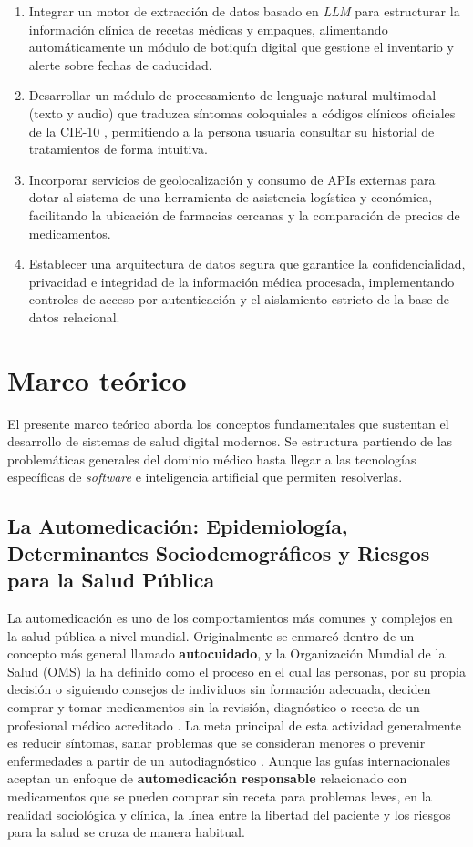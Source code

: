 \begin{enumerate}
    \item Integrar un motor de extracción de datos basado en \emph{LLM} para estructurar la información clínica de recetas médicas y empaques, alimentando automáticamente un módulo de botiquín digital que gestione el inventario y alerte sobre fechas de caducidad.
    \item Desarrollar un módulo de procesamiento de lenguaje natural multimodal (texto y audio) que traduzca síntomas coloquiales a códigos clínicos oficiales de la CIE-10 \cite{CIE10}, permitiendo a la persona usuaria consultar su historial de tratamientos de forma intuitiva.
    \item Incorporar servicios de geolocalización y consumo de APIs externas para dotar al sistema de una herramienta de asistencia logística y económica, facilitando la ubicación de farmacias cercanas y la comparación de precios de medicamentos.
    \item Establecer una arquitectura de datos segura que garantice la confidencialidad, privacidad e integridad de la información médica procesada, implementando controles de acceso por autenticación y el aislamiento estricto de la base de datos relacional.
\end{enumerate}

\clearpage

\section{Marco teórico}

El presente marco teórico aborda los conceptos fundamentales que sustentan el desarrollo de sistemas de salud digital modernos. Se estructura partiendo de las problemáticas generales del dominio médico hasta llegar a las tecnologías específicas de \emph{software} e inteligencia artificial que permiten resolverlas.

\subsection{La Automedicación: Epidemiología, Determinantes Sociodemográficos y Riesgos para la Salud Pública}

La automedicación es uno de los comportamientos más comunes y complejos en la salud pública a nivel mundial. Originalmente se enmarcó dentro de un concepto más general llamado \textbf{autocuidado}, y la Organización Mundial de la Salud (OMS) la ha definido como el proceso en el cual las personas, por su propia decisión o siguiendo consejos de individuos sin formación adecuada, deciden comprar y tomar medicamentos sin la revisión, diagnóstico o receta de un profesional médico acreditado \cite{alba2020principales}. La meta principal de esta actividad generalmente es reducir síntomas, sanar problemas que se consideran menores o prevenir enfermedades a partir de un autodiagnóstico \cite{pacha2023automedicacion}. Aunque las guías internacionales aceptan un enfoque de \textbf{automedicación responsable} relacionado con medicamentos que se pueden comprar sin receta para problemas leves, en la realidad sociológica y clínica, la línea entre la libertad del paciente y los riesgos para la salud se cruza de manera habitual.

